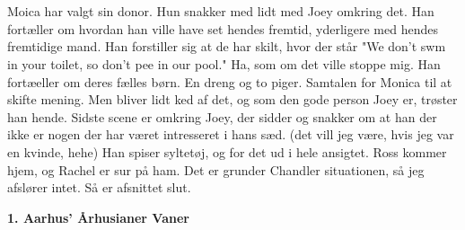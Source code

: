 \documentclass[]{article}
\begin{document}
\\ \\
Moica har valgt sin donor. Hun snakker med lidt med Joey omkring det. Han fortæller om hvordan han ville have set hendes fremtid, yderligere med hendes fremtidige mand. Han forstiller sig at de har skilt, hvor der står "We don't swm in your toilet, so don't pee in our pool." Ha, som om det ville stoppe mig. Han fortæeller om deres fælles børn. En dreng og to piger. Samtalen for Monica til at skifte mening. Men bliver lidt ked af det, og som den gode person Joey er, trøster han hende. Sidste scene er omkring Joey, der sidder og snakker om at han der ikke er nogen der har været intresseret i hans sæd. (det vill jeg være, hvis jeg var en kvinde, hehe) Han spiser syltetøj, og for det ud i hele ansigtet. Ross kommer hjem, og Rachel er sur på ham. Det er grunder Chandler situationen, så jeg afslører intet. Så er afsnittet slut.

\begin{center}
	\large\textbf{1. Aarhus' Århusianer Vaner}
\end{center}
\end{document}
